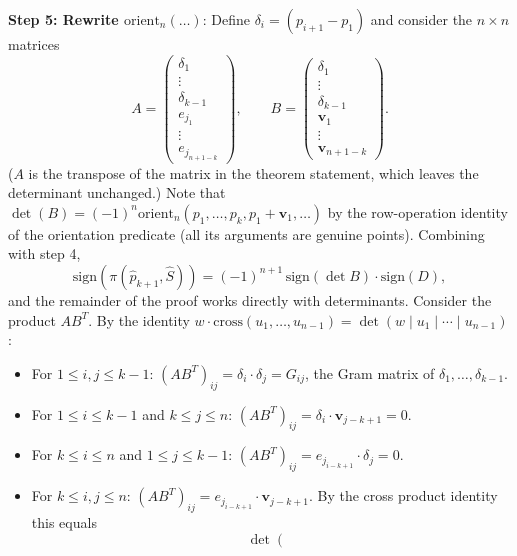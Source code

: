 \documentclass[12pt]{article}
\makeatletter
\theoremstyle{definition}
\theoremstyle{remark}
\renewenvironment{proof}[1][\proofname]{\par
  \pushQED{\qed}%
  \normalfont \footnotesize \topsep6\p@\@plus6\p@\relax
  \list{}{\leftmargin=2em
          \settowidth{\itemindent}{\itshape#1}%
          \labelwidth=\itemindent
          \parsep=0pt \listparindent=\parindent 
  }
  \item[\hskip\labelsep
        \itshape
    #1\@addpunct{.}]\ignorespaces
}{%
  \popQED\endlist\@endpefalse
}
\makeatother
\begin{document}
\begin{proof}
\bigskip\noindent
\textbf{Step 5: Rewrite $\mathrm{orient}_n(\ldots)$}:
Define $\delta_i = (p_{i+1} - p_1)$ and consider the $n \times n$ matrices
\begin{equation*}
A = \begin{pmatrix} \delta_1 \\ \vdots \\ \delta_{k-1} \\ e_{j_1} \\ \vdots \\ 
e_{j_{n+1-k}} \end{pmatrix}, \qquad
B = \begin{pmatrix} \delta_1 \\ \vdots \\ \delta_{k-1} \\ \mathbf{v}_1 \\ \vdots \\
\mathbf{v}_{n+1-k} \end{pmatrix}.
\end{equation*}
($A$ is the transpose of the matrix in the theorem statement, which leaves the
determinant unchanged.) Note that $\det(B) =
(-1)^n\mathrm{orient}_n(p_1,\ldots,p_k,p_1+\mathbf{v}_1,\ldots)$
by the row-operation identity of the orientation predicate (all its arguments
are genuine points). Combining with step 4,
\begin{equation*}
    \mathrm{sign}(\pi(\hat p_{k+1}, \hat S)) = (-1)^{n+1}\,\mathrm{sign}(\det B) \cdot \mathrm{sign}(D),
\end{equation*}
and the remainder of the proof works directly with determinants. Consider the product $AB^T$. By the identity
$w \cdot \mathrm{cross}(u_1,\ldots,u_{n-1}) = \det(w \mid u_1 \mid \cdots \mid u_{n-1})$:
\begin{itemize}
    \item For $1 \leq i,j \leq k-1$: $(AB^T)_{ij} = \delta_i \cdot \delta_j = G_{ij}$, 
    the Gram matrix of $\delta_1,\ldots,\delta_{k-1}$.
    \item For $1 \leq i \leq k-1$ and $k \leq j \leq n$: 
    $(AB^T)_{ij} = \delta_i \cdot \mathbf{v}_{j-k+1} = 0$.
    \item For $k \leq i \leq n$ and $1 \leq j \leq k-1$: 
    $(AB^T)_{ij} = e_{j_{i-k+1}} \cdot \delta_j = 0$.
    \item For $k \leq i,j \leq n$: $(AB^T)_{ij} = e_{j_{i-k+1}} \cdot \mathbf{v}_{j-k+1}$. 
    By the cross product identity this equals
    \begin{equation*}
    \det \left( \begin{array}{c|c|c|c|c|c|c|c|c}

\end{array}
\end{equation*}
\end{itemize}
\end{proof}
\end{document}

